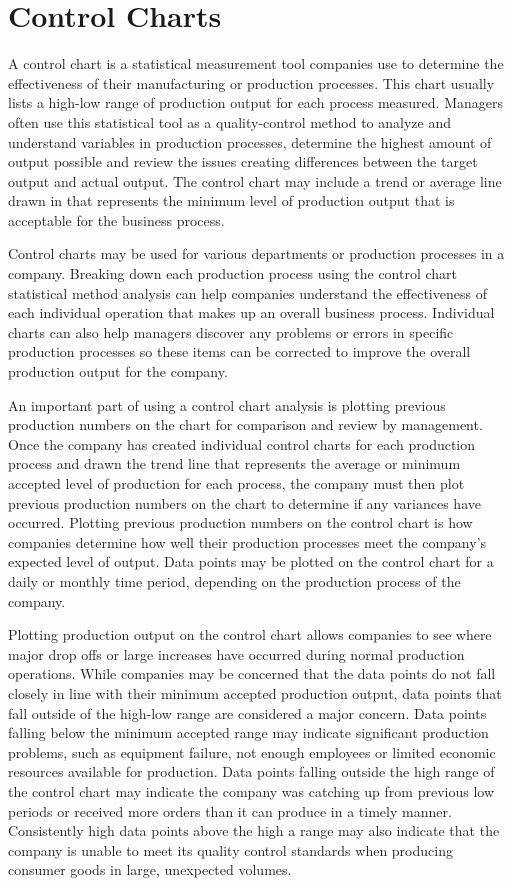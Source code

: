 \documentclass[12pt]{article}
\begin{document}
\tableofcontents

\section{Control Charts}
A control chart is a statistical measurement tool companies use to determine the effectiveness of their manufacturing or production processes. This chart usually lists a high-low range of production output for each process measured. Managers often use this statistical tool as a quality-control method to analyze and understand variables in production processes, determine the highest amount of output possible and review the issues creating differences between the target output and actual output. The control chart may include a trend or average line drawn in that represents the minimum level of production output that is acceptable for the business process.

Control charts may be used for various departments or production processes in a company. Breaking down each production process using the control chart statistical method analysis can help companies understand the effectiveness of each individual operation that makes up an overall business process. Individual charts can also help managers discover any problems or errors in specific production processes so these items can be corrected to improve the overall production output for the company.

An important part of using a control chart analysis is plotting previous production numbers on the chart for comparison and review by management. Once the company has created individual control charts for each production process and drawn the trend line that represents the average or minimum accepted level of production for each process, the company must then plot previous production numbers on the chart to determine if any variances have occurred. Plotting previous production numbers on the control chart is how companies determine how well their production processes meet the company’s expected level of output. Data points may be plotted on the control chart for a daily or monthly time period, depending on the production process of the company.

Plotting production output on the control chart allows companies to see where major drop offs or large increases have occurred during normal production operations. While companies may be concerned that the data points do not fall closely in line with their minimum accepted production output, data points that fall outside of the high-low range are considered a major concern. Data points falling below the minimum accepted range may indicate significant production problems, such as equipment failure, not enough employees or limited economic resources available for production. Data points falling outside the high range of the control chart may indicate the company was catching up from previous low periods or received more orders than it can produce in a timely manner. Consistently high data points above the high a range may also indicate that the company is unable to meet its quality control standards when producing consumer goods in large, unexpected volumes.
\end{document}
